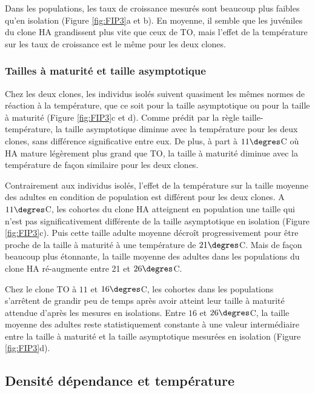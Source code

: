 Dans les populations, les taux de croissance mesurés sont beaucoup plus faibles
qu'en isolation (Figure \ref{fig:FIP3}a et b). En moyenne, il semble que les
juvéniles du clone HA grandissent plus vite que ceux de TO, mais l'effet de la
température sur les taux de croissance est le même pour les deux clones. 

\subsubsection{Tailles à maturité et taille asymptotique}

Chez les deux clones, les individus isolés suivent quasiment les mêmes normes de
réaction à la température, que ce soit pour la taille asymptotique ou pour la
taille à maturité (Figure \ref{fig:FIP3}c et d). Comme prédit par la règle
taille-température, la taille asymptotique diminue avec la température pour les
deux clones, sans différence significative entre eux. De plus, à part à
$11\degres$C où HA mature légèrement plus grand que TO, la taille à maturité
diminue avec la température de façon similaire pour les deux clones. 

Contrairement aux individus isolés, l'effet de la température sur la taille
moyenne des adultes en condition de population est différent pour les deux
clones. A $11\degres$C, les cohortes du clone HA atteignent en population une
taille qui n'est pas significativement différente de la taille asymptotique en
isolation (Figure \ref{fig:FIP3}c). Puis cette taille adulte moyenne décroît
progressivement pour être proche de la taille à maturité à une température de $21\degres$C. Mais de façon
beaucoup plus étonnante, la taille moyenne des adultes dans les populations du
clone HA ré-augmente entre 21 et $26\degres$C. 

Chez le clone TO à $11$ et $16\degres$C, les cohortes dans les populations
s'arrêtent de grandir peu de temps après avoir atteint leur taille à maturité
attendue d'après les mesures en isolations. Entre $16$ et $26\degres$C, la
taille moyenne des adultes reste statistiquement constante à une valeur intermédiaire
entre la taille à maturité et la taille asymptotique mesurées en isolation
(Figure \ref{fig:FIP3}d).

\subsection{Densité dépendance et température}

